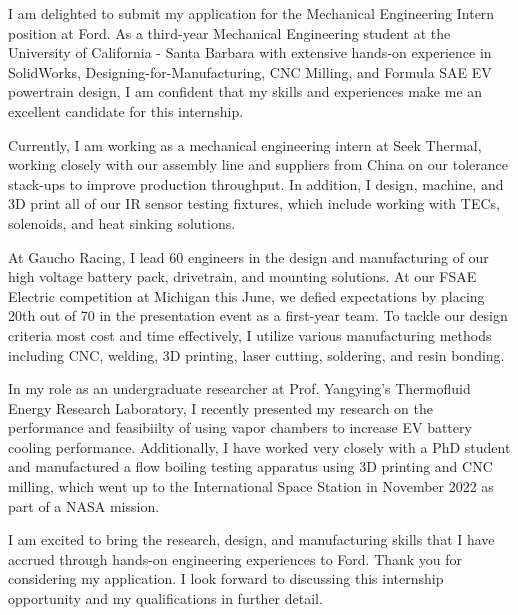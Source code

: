 \documentclass[11pt, letterpaper]{awesome-cv} %
\begin{document}
\makecvheader %

\makelettertitle %


\begin{cvletter}


I am delighted to submit my application for the Mechanical Engineering Intern position at Ford. As a third-year Mechanical Engineering student at the University of California - Santa Barbara with extensive hands-on experience in SolidWorks, Designing-for-Manufacturing, CNC Milling, and Formula SAE EV powertrain design,  I am confident that my skills and experiences make me an excellent candidate for this internship.

Currently, I am working as a mechanical engineering intern at Seek Thermal, working closely with our assembly line and suppliers from China on our tolerance stack-ups to improve production throughput. In addition, I design, machine, and 3D print all of our IR sensor testing fixtures, which include working with TECs, solenoids, and heat sinking solutions.

At Gaucho Racing, I lead 60 engineers in the design and manufacturing of our high voltage battery pack, drivetrain, and mounting solutions. At our FSAE Electric competition at Michigan this June, we defied expectations by placing 20th out of 70 in the presentation event as a first-year team. To tackle our design criteria most cost and time effectively, I utilize various manufacturing methods including CNC, welding, 3D printing, laser cutting, soldering, and resin bonding. 

In my role as an undergraduate researcher at Prof. Yangying's Thermofluid Energy Research Laboratory, I recently presented my research on the performance and feasibiilty of using vapor chambers to increase EV battery cooling performance. Additionally, I have worked very closely with a PhD student and manufactured a flow boiling testing apparatus using 3D printing and CNC milling, which went up to the International Space Station in November 2022 as part of a NASA mission. 

I am excited to bring the research, design, and manufacturing skills that I have accrued through hands-on engineering experiences to Ford. Thank you for considering my application. I look forward to discussing this internship opportunity and my qualifications in further detail.


\end{cvletter}


\makeletterclosing %
\end{document}
